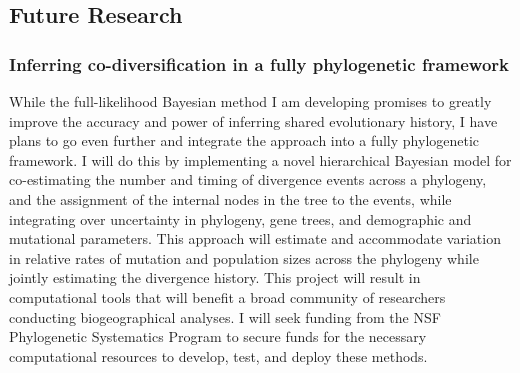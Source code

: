 
\subsection*{Future Research}


\subsubsection*{Inferring co-diversification in a fully phylogenetic framework}
While the full-likelihood Bayesian method I am developing promises to
greatly improve the accuracy and power of inferring shared evolutionary
history, I have plans to go even further and integrate the approach into a
fully phylogenetic framework.
I will do this by implementing a novel hierarchical Bayesian model for
co-estimating the number and timing of divergence events across a phylogeny,
and the assignment of the internal nodes in the tree to the events, while
integrating over uncertainty in phylogeny, gene trees, and demographic and
mutational parameters.
This approach will estimate and accommodate variation in relative rates of
mutation and population sizes across the phylogeny while jointly estimating the
divergence history.
This project will result in computational tools that will benefit a broad
community of researchers conducting biogeographical analyses. I will seek
funding from the NSF Phylogenetic Systematics Program to secure funds for the
necessary computational resources to develop, test, and deploy these methods.

